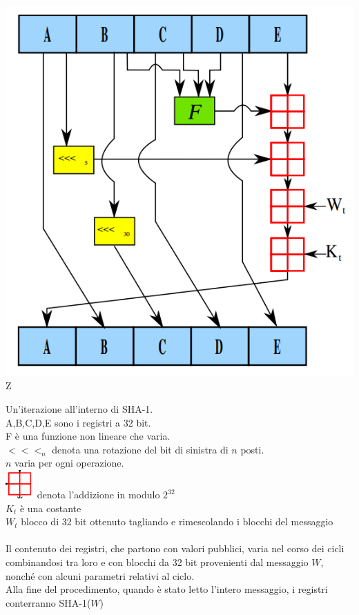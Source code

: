 \documentclass[10pt]{book}
\begin{document}
\begin{list}{}{}
\begin{list}{}{}
\begin{multicols}{2}
\begin{center}
				\includegraphics[scale=0.5]{18.png}Z
			\end{center}
				Un'iterazione all'interno di SHA-1.\\
				A,B,C,D,E sono i registri a 32 bit.\\
				F è una funzione non lineare che varia.\\
				$<<<_n$ denota una rotazione del bit di sinistra di $n$ posti.\\
			$n$ varia per ogni operazione.\\
			\includegraphics[scale=0.33]{19.png} denota l'addizione in modulo $2^{32}$\\
			$K_t$ è una costante\\
			$W_t$ blocco di 32 bit ottenuto tagliando e rimescolando i blocchi del messaggio\\\\
			Il contenuto dei registri, che partono con valori pubblici, varia nel corso dei cicli combinandosi tra loro e con blocchi da 32 bit provenienti dal messaggio $W$, nonché con alcuni parametri relativi al ciclo.\\
			Alla fine del procedimento, quando è stato letto l'intero messaggio, i registri conterranno SHA-1($W$)
		\end{multicols}
	\end{list}
\end{list}
\end{document}
